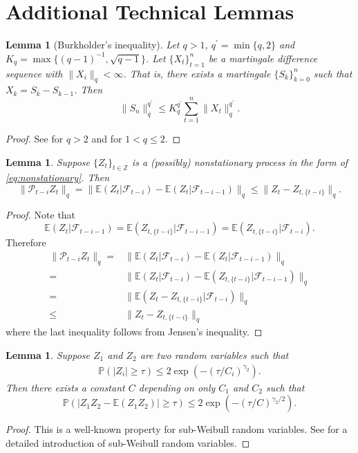 \documentclass[11pt]{article}
\newcommand{\E}{ { \mathbb{E} } }
\newcommand{\p}{\mathbb P}
\theoremstyle{plain}
\newtheorem{lemma}[theorem]{Lemma}
\theoremstyle{definition}
\begin{document}
\section{Additional Technical Lemmas}\label{sec-app-add} 
     \begin{lemma}[Burkholder's inequality]\label{lemma:Burkholder}
     Let $q>1$, $q^{\prime} = \min\{q,2\}$ and $K_q = \max\{(q-1)^{-1}, \sqrt{q-1}\}$. Let $\{ X_t\}_{t=1}^n $ be a martingale difference sequence with $\| X_i \|_{q} < \infty$. That is, there exists a martingale
     $ \{S_k\}_{k=0}^n$ such that $X_k =S_k-S_{k-1} $.
     Then 
     $$\| S_n\|_q^{q^{\prime}} \le K_q^{q^{\prime}}\sum_{t=1}^n \|X_t\|_q^{q^{\prime}}. $$
     
     
     \end{lemma}
     \begin{proof}
      See \cite{rio2009moment} for $q > 2$ and \cite{burkholder1988sharp} for $1 < q \leq 2$.
 
 \end{proof}	
 
\begin{lemma}
Suppose $\{Z_t\}_{t\in \mathbb Z}$ is a (possibly) nonstationary process in the form of \eqref{eq:nonstationary}. Then
$$\| \mathcal P_{t-i} Z_t\|_q = \| \E(Z_t | \mathcal F_{t-i} ) - \E(Z_t | \mathcal F_{t-i-1} )\|_ q  \le \| Z_t-Z_{t, \{t-i\}} \|_q  . $$

\end{lemma} 
 \begin{proof}
 Note  that 
 $$\E(Z_t | \mathcal F_{t-i-1} ) =  \E(Z_{ t,\{ t-i\}}| \mathcal F_{t-i-1} ) =\E(Z_{ t,\{ t-i\}}| \mathcal F_{t-i} ) .$$
 Therefore
 \begin{align*}
 \| \mathcal P_{t-i} Z_t\|_q  = &\| \E(Z_t | \mathcal F_{t-i} ) - \E(Z_t | \mathcal F_{t-i-1} )\|_q  
 \\= &\| \E (Z_t | \mathcal F_{t-i}) -\E(Z_{ t,\{ t-i\}}| \mathcal F_{t-i-1} )\|_ q  
 \\ 
 = & \| \E (Z_t-Z_{ t,\{ t-i\}}  | \mathcal F_{t-i})  \|_ q  
 \\
    \le &  \| Z_t-Z_{t, \{t-i\}} \| _q 
 \end{align*}
 where the last inequality follows from Jensen's inequality. 
 \end{proof}
 
 \begin{lemma}\label{lemma:subweibull}
 Suppose $Z_1$ and $Z_2$ are two random variables such that 
 \begin{align} \label{eq:Z subweibull} \p ( |Z_i| \ge \tau) \le 2 \exp(- (\tau/C_i)^ {\gamma_2} ).
 \end{align}
 Then there exists a constant $C$ depending on only $C_1$ and $C_2$ such that 
 $$ \p ( |Z_1Z_2 -\E(Z_1Z_2) | \ge \tau) \le 2 \exp(- (\tau/C)^ {\gamma_2 /2}) .$$
 \end{lemma}
 \begin{proof}
This  is a well-known property for  sub-Weibull random variables. See \cite{wong2020lasso}  for a detailed introduction of sub-Weibull random variables. 
 \end{proof} 
 
\end{document}
